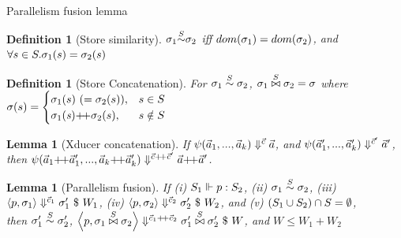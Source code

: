 \documentclass{beamer}
\newtheorem{lem}[thm]{Lemma}
\newtheorem{defi}[thm]{Definition}
\begin{document}
\begin{frame}{Parallelism fusion lemma}
\small
\begin{defi}[Store similarity]	
	$\sgm_1 {\~{\S}} \sgm_2 $ iff $dom(\sgm_1) = dom(\sgm_2)$, and $\forall s \in \S.\sgm_1(s)= \sgm_2(s)$ \\
\end{defi}

\begin{defi}[Store Concatenation]
	For $\sgm_1 \~\S \sgm_2$,
	$\sgm_1 \x{\S} \sgm_2 = \sgm$ where
	$\sgm(s) =
	\begin{cases}
	\sgm_1(s) \ (=\sgm_2(s)), & s \in \S\\
	\sgm_1(\s) {\++} \sgm_2(s), & s \notin \S \\
	\end{cases} $
\end{defi}

\begin{lem}[Xducer concatenation] 
	If  $\sevalfg{\lcall}{\a_{1},...,\a_{k}}{\c}{\a}$, and $\sevalfg{\lcall}{\a'_{1},...,\a'_{k}}{\c'}{\a'}$, \\
	then $\sevalfg{\lcall}{\a_{1} {\++} \a'_{1},...,\a_{k} {\++} \a'_{k}}{\c {\++} \c'}{\a {\++} \a'}$.
\end{lem}

\begin{lem} [Parallelism fusion]
	If (i) $\wf{p}{\S_1}{\S_2}$, (ii) $\sgm_1 \~{\S} \sgm_2$,  (iii) $\seval{p}{\sgm_1}{\c_1}{\sgm_1'}{W_1}$, (iv) $\seval{p}{\sgm_2} {\c_2} {\sgm_2'}{W_2}$, and (v) $(\S_1 \cup \S_2) \cap \S = \emptyset $, \\
	then $\sgm_1' \~\S \sgm_2'$, $\seval{p}{\sgm_1 \x\S \sgm_2}{\c_1 {\++} \c_2}{ \sgm_1' \x\S \sgm_2' }{W}$, and $W \le W_1 + W_2$
\end{lem}


\end{frame}
\end{document}

